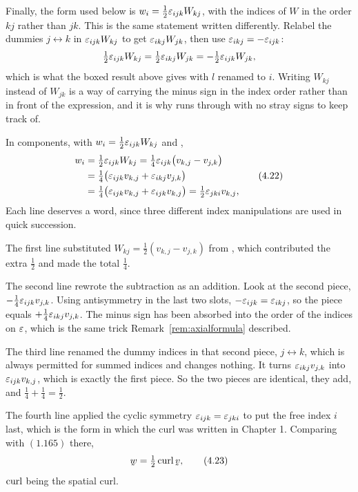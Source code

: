 \begin{remark}[where $w_{i}=\tfrac12\eps_{ijk}W_{kj}$ comes
from]
Finally, the form used below is $w_{i}=\tfrac12\eps_{ijk}W_{kj}$, with the
indices of $W$ in the order $kj$ rather than $jk$. This is the same
statement written differently. Relabel the dummies $j\leftrightarrow k$ in
$\varepsilon_{ijk}W_{kj}$ to get $\varepsilon_{ikj}W_{jk}$, then use
$\varepsilon_{ikj}=-\varepsilon_{ijk}$:
\[
   \tfrac12\varepsilon_{ijk}W_{kj}=\tfrac12\varepsilon_{ikj}W_{jk}
   =-\tfrac12\varepsilon_{ijk}W_{jk},
\]
which is what the boxed result above gives with $l$ renamed to $i$.
Writing $W_{kj}$ instead of $W_{jk}$ is a way of carrying the minus sign in
the index order rather than in front of the expression, and it is why
 runs through with no stray signs to keep track of.
\end{remark}

In components, with $w_{i}=\tfrac12\eps_{ijk}W_{kj}$ and ,
\begin{equation}
\begin{aligned}
   w_{i}&=\tfrac12\varepsilon_{ijk}W_{kj}
   =\tfrac14\varepsilon_{ijk}\big(v_{k,j}-v_{j,k}\big)\\
   &=\tfrac14\big(\varepsilon_{ijk}v_{k,j}+\varepsilon_{ikj}v_{j,k}\big)\\
   &=\tfrac14\big(\varepsilon_{ijk}v_{k,j}+\varepsilon_{ijk}v_{k,j}\big)
    =\tfrac12\varepsilon_{jki}v_{k,j},
\end{aligned}
   \tag{4.22}\label{eq:4.22}
\end{equation}
Each line deserves a word, since three different index manipulations are
used in quick succession.

The first line substituted $W_{kj}=\tfrac12(v_{k,j}-v_{j,k})$ from
, which contributed the extra $\tfrac12$ and made the total
$\tfrac14$.

The second line rewrote the subtraction as an addition. Look at the second
piece, $-\tfrac14\varepsilon_{ijk}v_{j,k}$. Using antisymmetry in the last two
slots, $-\varepsilon_{ijk}=\varepsilon_{ikj}$, so the piece equals
$+\tfrac14\varepsilon_{ikj}v_{j,k}$. The minus sign has been absorbed into the
order of the indices on $\varepsilon$, which is the same trick
Remark~\ref{rem:axialformula} described.

The third line renamed the dummy indices in that second piece,
$j\leftrightarrow k$, which is always permitted for summed indices and
changes nothing. It turns $\varepsilon_{ikj}v_{j,k}$ into $\varepsilon_{ijk}v_{k,j}$,
which is exactly the first piece. So the two pieces are identical, they
add, and $\tfrac14+\tfrac14=\tfrac12$.

The fourth line applied the cyclic symmetry $\varepsilon_{ijk}=\varepsilon_{jki}$ to put
the free index $i$ last, which is the form in which the curl was written
in Chapter 1. Comparing with $(1.165)$ there,
\begin{equation}
   \bw=\tfrac12\crl\bv ,
   \tag{4.23}\label{eq:4.23}
\end{equation}
$\operatorname{curl}$ being the spatial curl.

